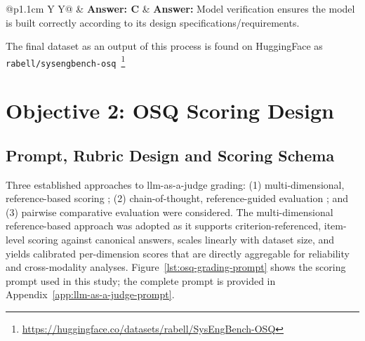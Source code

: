 \begin{table}[t]
\begin{tabularx}{\textwidth}{@{}p{1.1cm} Y Y@{}}
& \textbf{Answer: C} &
\textbf{Answer:} Model verification ensures the model is built correctly according to its design specifications/requirements. \\

\specialrule{0.9pt}{0pt}{0pt}
\end{tabularx}
\caption{Paired MCQ and OSQ examples (SysEngBench-OSQ; 2 and 107).}
\end{table}


The final dataset as an output of this process is found on HuggingFace as  \texttt{rabell/sysengbench-osq}~\footnote{\url{https://huggingface.co/datasets/rabell/SysEngBench-OSQ}}

\clearpage





\section{Objective 2: OSQ Scoring Design}
\label{sec:ch3_obj2}

\subsection{Prompt, Rubric Design and Scoring Schema}
\label{subsec:ch3_obj2_rubric}

Three established approaches to \ac{llm}-as-a-judge grading: (1) multi-dimensional, reference-based scoring \cite{lin_LLMEvalUnifiedMultiDimensionalAutomatic_2023}; (2) chain-of-thought, reference-guided evaluation \cite{zheng_JudgingLLMasaJudgeMTBench_2023, liu_GEvalNLGEvaluationUsing_2023}; and (3) pairwise comparative evaluation \cite{zheng_JudgingLLMasaJudgeMTBench_2023, dubois_Length_Controlled_Alpaca_Eval_Simple_2025} were considered. The multi-dimensional reference-based approach was adopted as it supports criterion-referenced, item-level scoring against canonical answers, scales linearly with dataset size, and yields calibrated per-dimension scores that are directly aggregable for reliability and cross-modality analyses. Figure~\ref{lst:osq-grading-prompt} shows the scoring prompt used in this study; the complete prompt is provided in Appendix~\ref{app:llm-as-a-judge-prompt}.

